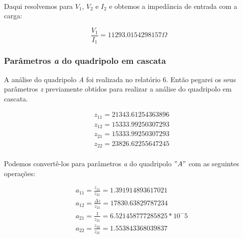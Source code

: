 \documentclass[12pt,twoside, a4paper, twocolumn]{article}
\begin{document}
\paragraph*{}
\paragraph*{}
\paragraph*{}
\paragraph*{}
Daqui resolvemos para $V_1$, $V_2$ e $I_2$ e obtemos a impedância de entrada com a carga:


\begin{equation}
    \frac{V_1}{I_1} = 11293.0154298157 \varOmega
\end{equation}


\subsubsection{Parâmetros \emph{a} do quadripolo em cascata}


A análise do quadripolo \emph{A} foi realizada no relatório 6. Então pegarei os seus parâmetros \emph{z} previamente obtidos para realizar a análise do quadripolo em cascata.


\begin{equation}
    \begin{aligned}
         & z_{11} = 21343.61254363896 \\
         & z_{12} = 15333.99250307293 \\
         & z_{21} = 15333.99250307293 \\
         & z_{22} = 23826.62255647245 \\
    \end{aligned}
\end{equation}


Podemos convertê-los para parâmetros \emph{a} do quadripolo $"A"$ com as seguintes operações:




\begin{equation}
    \begin{aligned}
         & a_{11} = \frac{z_{11}}{z_{21}} = 1.391914893617021      \\
         & a_{12} = \frac{\varDelta z}{z_{21}} = 17830.63829787234 \\
         & a_{21} = \frac{1}{z_{21}} = 6.521458777285825 * 10^-5   \\
         & a_{22} = \frac{z_{22}}{z_{21}} = 1.553843368039837
    \end{aligned}
\end{equation}
\end{document}
